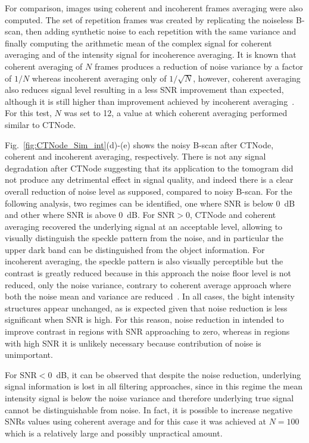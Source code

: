 For comparison, images using coherent and incoherent frames averaging were also computed. The set of repetition frames was created by replicating the noiseless B-scan, then adding synthetic noise to each repetition with the same variance and finally computing the arithmetic mean of the complex signal for coherent averaging and of the intensity signal for incoherence averaging. It is known that coherent averaging of $N$ frames produces a reduction of noise variance by a factor of $1/N$ whereas incoherent averaging only of $1/\sqrt{N}$, however, coherent averaging also reduces signal level resulting in a less SNR improvement than expected, although it is still higher than improvement achieved by incoherent averaging~\cite{Baumann2019_Signal}. For this test, $N$ was set to 12, a value at which coherent averaging performed similar to CTNode. 

Fig.~\ref{fig:CTNode_Sim_int}(d)-(e) shows the noisy B-scan after CTNode, coherent and incoherent averaging, respectively. There is not any signal degradation after CTNode suggesting that its application to the tomogram did not produce any detrimental effect in signal quality, and indeed there is a clear overall reduction of noise level as supposed, compared to noisy B-scan. For the following analysis, two regimes can be identified, one where SNR is below 0~dB and other where SNR is above 0~dB. For $\text{SNR}>0$, CTNode and coherent averaging recovered the underlying signal at an acceptable level, allowing to visually distinguish the speckle pattern from the noise, and in particular the upper dark band can be distinguished from the object information. For incoherent averaging, the speckle pattern is also visually perceptible but the contrast is greatly reduced because in this approach the noise floor level is not reduced, only the noise variance, contrary to coherent average approach where both the noise mean and variance are reduced~\cite{Baumann2019_Signal}. In all cases, the bight intensity structures appear unchanged, as is expected given that noise reduction is less significant when SNR is high. For this reason, noise reduction in intended to improve contrast in regions with SNR approaching to zero, whereas in regions with high SNR it is unlikely necessary because contribution of noise is unimportant. 

For $\text{SNR}<0$~dB, it can be observed that despite the noise reduction, underlying signal information is lost in all filtering approaches, since in this regime the mean intensity signal is below the noise variance and therefore underlying true signal cannot be distinguishable from noise. In fact, it is possible to increase negative SNRs values using coherent average and for this case it was achieved at $N=100$ which is a relatively large and possibly unpractical amount.

